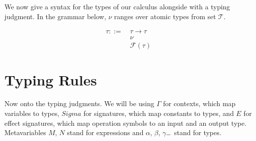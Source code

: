 We now give a syntax for the types of our calculus alongside with a typing
judgment. In the grammar below, $\nu$ ranges over atomic types from set
$\mathcal{T}$.

\begin{align*}
  \tau ::= \
  & \tau \to \tau \\
  & \nu \\
  & \mathcal{F}(\tau)
\end{align*}


\section{Typing Rules}

Now onto the typing judgments. We will be using $\Gamma$ for contexts,
which map variables to types, $Sigma$ for signatures, which map constants
to types, and $E$ for effect signatures, which map operation symbols to an
input and an output type. Metavariables $M$, $N$ stand for expressions and
$\alpha$, $\beta$, $\gamma$\ldots\ stand for types.

